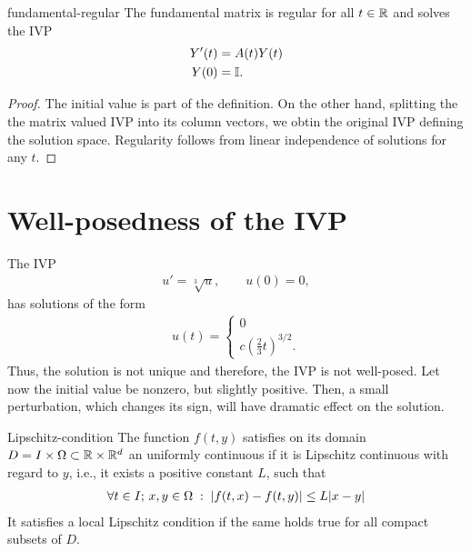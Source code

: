 


\begin{Corollary}{fundamental-regular}
  The fundamental matrix is regular for all $t\in \mathbb R$ and solves the
  IVP
  \begin{align*}
    Y'(t) &= A(t)Y(t)\\
    Y (0) &= \mathbb I.
  \end{align*}
\end{Corollary}

\begin{proof}
  The initial value is part of the definition. On the other hand,
  splitting the the matrix valued IVP into its column vectors, we
  obtin the original IVP defining the solution space. Regularity
  follows from linear independence of solutions for any $t$.
\end{proof}

\section{Well-posedness of the IVP}
\label{sec:awa:well-posedness}




\begin{example}
  The IVP
  \begin{gather*}
    u'= \sqrt[3]{u}, \qquad u(0) = 0,
  \end{gather*}
  has solutions of the form
  \begin{gather*}
    u(t) =
    \begin{cases}
      0 \\
      c \left(\tfrac23t\right)^{3/2}.
    \end{cases}
  \end{gather*}
  Thus, the solution is not unique and therefore, the IVP is not
  well-posed.
  Let now the initial value be nonzero, but slightly positive. Then, a small
  perturbation, which changes its sign, will have dramatic effect on
  the solution.
\end{example}

\begin{Definition}{Lipschitz-condition}
  The function $f(t,y)$ satisfies on its domain $D = I\times\Omega \subset
  \mathbb R \times \mathbb R^d$ an uniformly continuous  if 
	it is Lipschitz continuous with regard to $y$, i.e., it exists a 
	positive constant $L$, such that
  \begin{gather}
    \label{eq:awa:1}
    \forall t\in I;\,x,y\in\Omega \;:\;
    \lvert f(t,x)-f(t,y)\rvert \le L \lvert x-y\rvert
  \end{gather}
  It satisfies a local Lipschitz condition if the same holds true for all 
  compact subsets of $D$.
\end{Definition}


